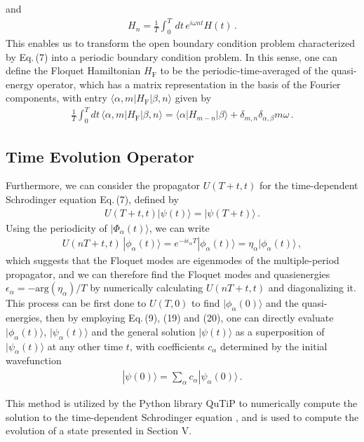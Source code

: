 \documentclass[reprint, amsmath, amssymb, aps]{revtex4-2}
\begin{document}
and 
\begin{align}
H_n =\frac{1}{T}\int_0^T\, dt\,
e^{i\omega n t}H(t)\,. 
\end{align}
This enables us to transform the open boundary condition problem characterized by Eq.\,(7) into a periodic boundary condition problem. In this sense, one can define the Floquet Hamiltonian $H_{\text{F}}$ to be the periodic-time-averaged of the quasi-energy operator, which has a matrix representation in the basis of the Fourier components, with entry $\langle \alpha, m |H_{\text{F}}|\beta, n\rangle$ given by
\begin{align}
\frac{1}{T}\int_0^Tdt\, \langle \alpha, m | H_{\text{F}} | \beta, n\rangle  = \langle \alpha | H_{m-n} | \beta \rangle + \delta_{m,n}\delta_{\alpha,\beta}m \omega\,.
\end{align}
\subsection{Time Evolution Operator}
Furthermore, we can consider the propagator $U(T+t,t)$ for the time-dependent Schrodinger equation Eq.\,(7), defined by 
\begin{align}
U(T+t,t)|\psi(t)\rangle = |\psi(T+t)\rangle\,.
\end{align}
Using the periodicity of $|\Phi_\alpha(t)\rangle$, we can write
\begin{align}
U(nT+t,t)\, |\phi_\alpha(t)\rangle = e^{-i\epsilon_\alpha T}|\phi_\alpha(t)\rangle = \eta_\alpha |\phi_\alpha(t)\rangle\,,
\end{align}
which suggests that the Floquet modes are eigenmodes of the multiple-period propagator, and we can therefore find the Floquet modes and quasienergies $\epsilon_\alpha = -\text{arg}(\eta_\alpha)/T$ by numerically calculating $U(nT+t,t)$ and diagonalizing it. This process can be first done to $U(T,0)$ to find $|\phi_\alpha(0)\rangle$ and the quasi-energies, then by employing Eq.\,(9), (19) and (20), one can directly evaluate $|\phi_\alpha(t)\rangle$, $|\psi_\alpha(t)\rangle$ and the general solution $|\psi(t)\rangle$ as a superposition of $|\psi_\alpha(t)\rangle$ at any other time $t$, with coefficients $c_\alpha$ determined by the initial wavefunction 
\begin{align}
|\psi(0)\rangle = \sum_\alpha c_\alpha |\psi_\alpha(0)\rangle\,.
\end{align}

This method is utilized by the Python library QuTiP to numerically compute the solution to the time-dependent Schrodinger equation \cite{QuTiP}, and is used to compute the evolution of a state presented in Section V.
\end{document}
